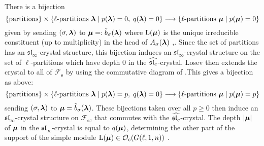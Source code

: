 \documentclass[12pt]{amsart}
\numberwithin{equation}{section}
\theoremstyle{definition}
\newcommand{\oh}{\mathcal{O}}
\newcommand{\el}{\mathrm{L}}
\newcommand{\slinf}{\mathfrak{sl}_\infty}
\newcommand{\mbs}{\mathbf{s}}
\begin{document}
There is a bijection $$\{\hbox{partitions}\}\times\{\ell\hbox{-partitions }\boldsymbol{\lambda}\;|\;p(\boldsymbol{\lambda})=0,\;q(\boldsymbol{\lambda})=0\}\longrightarrow\{\ell\hbox{-partitions }\boldsymbol{\mu}\mid p(\boldsymbol{\mu})=0\}$$ given by sending $(\sigma,\boldsymbol{\lambda})$ to $\boldsymbol{\mu}=:\tilde{b}_\sigma(\boldsymbol{\lambda})$ where $\el(\bmu)$ is the unique irreducible constituent (up to multiplicity) in the head of $A_\sigma(\boldsymbol{\lambda})$ \cite[Section 5.6]{ShanVasserot2012},\cite[Section 5.1]{Losev2015}. Since the set of partitions has an $\slinf$-crystal structure, this bijection induces an $\slinf$-crystal structure on the set of $\ell$-partitions which have depth $0$ in the $\widehat{\mathfrak{sl}_e}$-crystal. 
Losev then extends the crystal to all of $\mathcal{F}_\mbs$ by using the commutative diagram of \cite[Proposition 5.1]{Losev2015}.This gives a bijection as above: $$\{\hbox{partitions} \}\times\{\ell\hbox{-partitions }\boldsymbol{\lambda}\;|\;p(\boldsymbol{\lambda})=p,\;q(\boldsymbol{\lambda})=0\}\longrightarrow \{\ell\hbox{-partitions }\boldsymbol{\mu}\;|\;p(\boldsymbol{\mu})=p\}$$
sending $(\sigma,\boldsymbol{\lambda})$ to $\boldsymbol{\mu}=\tilde{b}_\sigma(\boldsymbol{\lambda})$.
These bijections taken over all $p\geq 0$ then induce an $\slinf$-crystal structure on $\mathcal{F}_\mbs$, that commutes with the $\widehat{\mathfrak{sl}_e}$-crystal.
The depth $|\boldsymbol{\mu}|$ of $\boldsymbol{\mu}$ in the $\slinf$-crystal is equal to $q(\boldsymbol{\mu})$, determining the other part of the support of the simple module $\el(\bmu)\in\oh_c(G(\ell,1,n))$ \cite{Losev2015}. 
\end{document}
